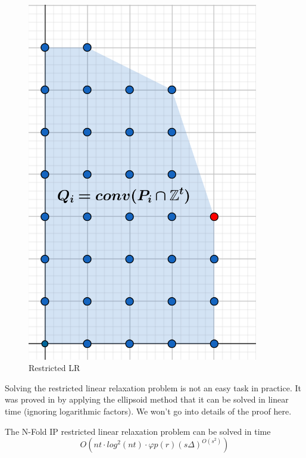 \begin{figure}[h]
\begin{minipage}[b]{0.45\textwidth}
    \includegraphics[width=0.9\textwidth]{images/IP(3).png}
    \caption{Restricted LR}
\end{minipage}
\end{figure}

Solving the restricted linear relaxation problem is not an easy task in practice. It was proved in \cite{EISENBRAND:2020} by applying the ellipsoid method that it can be solved in linear time (ignoring logarithmic factors). We won't go into details of the proof here. 

\begin{lemma}
    The N-Fold IP restricted linear relaxation problem can be solved in time
    \begin{equation*}
        O(nt \cdot log^2(nt) \cdot \varphi p(r) (s\Delta)^{O(s^2)})
    \end{equation*}
\end{lemma}

